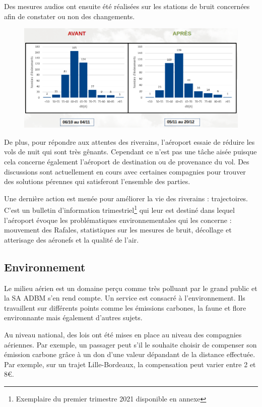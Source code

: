 Des mesures audios ont ensuite été réalisées sur les stations de bruit concernées afin de constater ou non des changements.

\begin{figure}[hbt!]
  \centering
  \includegraphics[width=14cm]{Images/bruit_avant_apres.png}\newline
  \label{fig:Mesures audios}
\end{figure}

De plus, pour répondre aux attentes des riverains, l'aéroport essaie de réduire les vols de nuit qui sont très gênants. Cependant ce n'est pas une tâche aisée puisque cela concerne également l'aéroport de destination ou de provenance du vol. Des discussions sont actuellement en cours avec certaines compagnies pour trouver des solutions pérennes qui satisferont l'ensemble des parties.\newline


Une dernière action est menée pour améliorer la vie des riverains : trajectoires. C'est un bulletin d'information trimestriel\footnote{Exemplaire du premier trimestre 2021 disponible en annexe} qui leur est destiné dans lequel l'aéroport évoque les problématiques environnementales qui les concerne : mouvement des Rafales, statistiques sur les mesures de bruit, décollage et atterisage des aéronefs et la qualité de l'air.


\subsection{Environnement}

Le milieu aérien est un domaine perçu comme très polluant par le grand public et la SA ADBM s'en rend compte. Un service est consacré à l'environnement. Ils travaillent sur différents points comme les émissions carbones, la faune et flore environnante mais également d'autres sujets.


Au niveau national, des lois ont été mises en place au niveau des compagnies aériennes. Par exemple, un passager peut s'il le souhaite choisir de compenser son émission carbone grâce à un don d'une valeur dépandant de la distance effectuée. Par exemple, sur un trajet Lille-Bordeaux, la compensation peut varier entre 2 et 8€.

